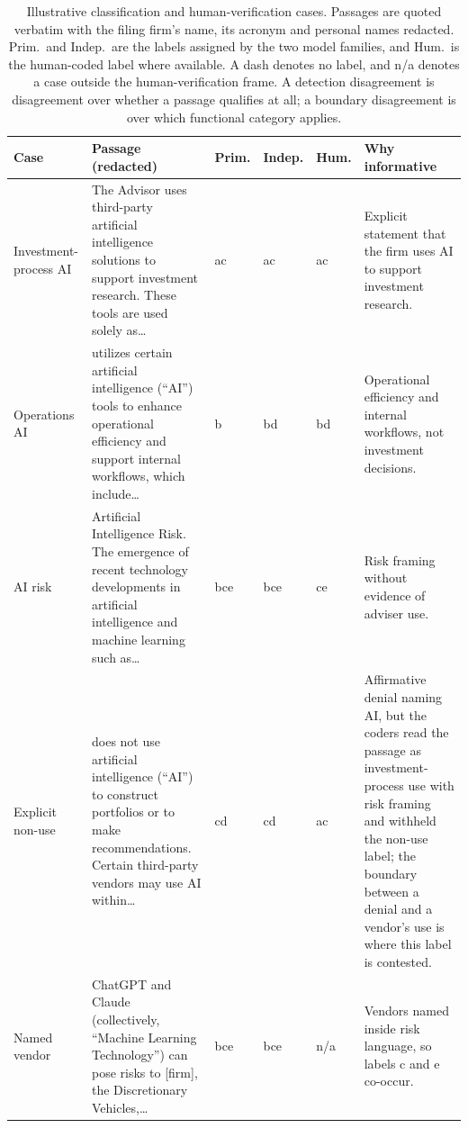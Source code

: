 \documentclass[utf8]{FrontiersinHarvard}
\begin{document}
\begin{table}[h!]
\caption{Illustrative classification and human-verification cases. Passages are quoted verbatim with the filing firm's name, its acronym and personal names redacted. Prim.\ and Indep.\ are the labels assigned by the two model families, and Hum.\ is the human-coded label where available. A dash denotes no label, and n/a denotes a case outside the human-verification frame. A detection disagreement is disagreement over whether a passage qualifies at all; a boundary disagreement is over which functional category applies.}
\label{tab:cases}
\scriptsize
\setlength{\tabcolsep}{3pt}
\begin{tabular}{@{}>{\raggedright\arraybackslash}p{}>{\raggedright\arraybackslash}p{}>{\raggedright\arraybackslash}p{}>{\raggedright\arraybackslash}p{}>{\raggedright\arraybackslash}p{}>{\raggedright\arraybackslash}p{}@{}}
\toprule
Case & Passage (redacted) & Prim. & Indep. & Hum. & Why informative \\
\midrule
Investment-process AI & The Advisor uses third-party artificial intelligence solutions to support investment research. These tools are used solely as\ldots & ac & ac & ac & Explicit statement that the firm uses AI to support investment research. \\
Operations AI & utilizes certain artificial intelligence (``AI'') tools to enhance operational efficiency and support internal workflows, which include\ldots & b & bd & bd & Operational efficiency and internal workflows, not investment decisions. \\
AI risk & Artificial Intelligence Risk. The emergence of recent technology developments in artificial intelligence and machine learning such as\ldots & bce & bce & ce & Risk framing without evidence of adviser use. \\
Explicit non-use & does not use artificial intelligence (``AI'') to construct portfolios or to make recommendations. Certain third-party vendors may use AI within\ldots & cd & cd & ac & Affirmative denial naming AI, but the coders read the passage as investment-process use with risk framing and withheld the non-use label; the boundary between a denial and a vendor's use is where this label is contested. \\
Named vendor & ChatGPT and Claude (collectively, ``Machine Learning Technology'') can pose risks to [firm], the Discretionary Vehicles,\ldots & bce & bce & n/a & Vendors named inside risk language, so labels c and e co-occur. \\

\end{tabular}
\end{table}
\end{document}
